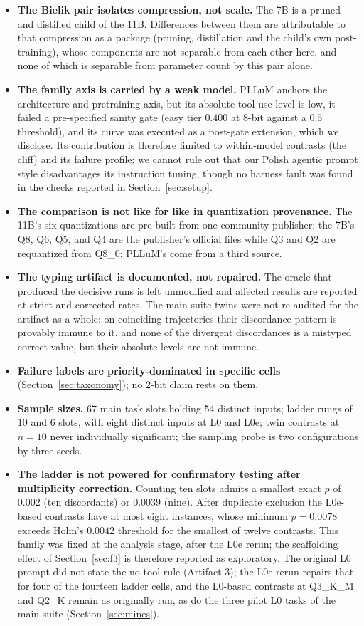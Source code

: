 \documentclass[11pt]{article}
\begin{document}
\begin{itemize}
  \item \textbf{The Bielik pair isolates compression, not scale.} The 7B is a pruned and distilled child of the 11B. Differences between them are attributable to that compression as a package (pruning, distillation and the child's own post-training), whose components are not separable from each other here, and none of which is separable from parameter count by this pair alone.
  \item \textbf{The family axis is carried by a weak model.} PLLuM anchors the architecture-and-pretraining axis, but its absolute tool-use level is low, it failed a pre-specified sanity gate (easy tier $0.400$ at 8-bit against a $0.5$ threshold), and its curve was executed as a post-gate extension, which we disclose. Its contribution is therefore limited to within-model contrasts (the cliff) and its failure profile; we cannot rule out that our Polish agentic prompt style disadvantages its instruction tuning, though no harness fault was found in the checks reported in Section~\ref{sec:setup}.
  \item \textbf{The comparison is not like for like in quantization provenance.} The 11B's six quantizations are pre-built from one community publisher; the 7B's Q8, Q6, Q5, and Q4 are the publisher's official files while Q3 and Q2 are requantized from Q8\_0; PLLuM's come from a third source.
  \item \textbf{The typing artifact is documented, not repaired.} The oracle that produced the decisive runs is left unmodified and affected results are reported at strict and corrected rates. The main-suite twins were not re-audited for the artifact as a whole: on coinciding trajectories their discordance pattern is provably immune to it, and none of the divergent discordances is a mistyped correct value, but their absolute levels are not immune.
  \item \textbf{Failure labels are priority-dominated in specific cells} (Section~\ref{sec:taxonomy}); no 2-bit claim rests on them.
  \item \textbf{Sample sizes.} 67 main task slots holding 54 distinct inputs; ladder rungs of 10 and 6 slots, with eight distinct inputs at L0 and L0e; twin contrasts at $n=10$ never individually significant; the sampling probe is two configurations by three seeds.
  \item \textbf{The ladder is not powered for confirmatory testing after multiplicity correction.} Counting ten slots admits a smallest exact $p$ of $0.002$ (ten discordants) or $0.0039$ (nine). After duplicate exclusion the L0e-based contrasts have at most eight instances, whose minimum $p=0.0078$ exceeds Holm's $0.0042$ threshold for the smallest of twelve contrasts. This family was fixed at the analysis stage, after the L0e rerun; the scaffolding effect of Section~\ref{sec:f3} is therefore reported as exploratory. The original L0 prompt did not state the no-tool rule (Artifact 3); the L0e rerun repairs that for four of the fourteen ladder cells, and the L0-based contrasts at Q3\_K\_M and Q2\_K remain as originally run, as do the three pilot L0 tasks of the main suite (Section~\ref{sec:mines}).

\end{itemize}
\end{document}
